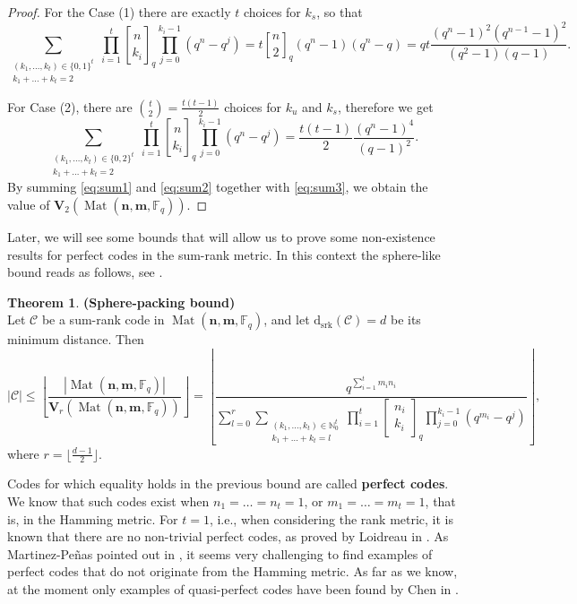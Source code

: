 \documentclass[11pt]{amsart}
\newcommand{\qqbin}[2]{\begin{bmatrix}
		{#1} \\ {#2 }
\end{bmatrix}_q}
\newcommand{\dsrk}{\mathrm{d}_{\mathrm{srk}}}
\DeclareMathOperator{\Mat}{Mat}
\theoremstyle{definition}
\newtheorem{theorem}{Theorem}[section]
\newcommand{\F}{{\mathbb F}}
\newcommand{\bfn}{\mathbf {n}}
\newcommand{\bfm}{\mathbf {m}}
\newcommand{\spacmn}{\Mat(\bfn,\bfm,\F_q)}
\newcommand{\qbinom}[2]{\genfrac{[}{]}{0pt}{}{#1}{#2}_q}
\begin{document}
\begin{proof}
For the Case (1) there are exactly $t$ choices for $k_s$, so that 
\begin{equation}\label{eq:sum1}
\sum_{\substack{(k_1,\ldots,k_t) \in \{0,1\}^t \\ k_1+\ldots +k_t=2}}\prod_{i=1}^{t}\qbinom{n}{k_i}\prod_{j=0}^{k_i-1}(q^n-q^j)=t\qbinom{n}{2}(q^n-1)(q^n-q)=qt\frac{(q^n-1)^2(q^{n-1}-1)^2}{(q^2-1)(q-1)}.
\end{equation}

For Case (2), there are $\binom{t}{2}=\frac{t(t-1)}{2}$ choices for $k_u$ and $k_s$, therefore we get 
\begin{equation}\label{eq:sum2}
\sum_{\substack{(k_1,\ldots,k_t) \in \{0,2\}^t \\ k_1+\ldots +k_t=2}}\prod_{i=1}^{t}\qbinom{n}{k_i}\prod_{j=0}^{k_i-1}(q^n-q^j)=\frac{t(t-1)}{2}\frac{(q^n-1)^4}{(q-1)^2}.
\end{equation}
By summing \eqref{eq:sum1} and \eqref{eq:sum2} together with \eqref{eq:sum3}, we obtain the value of $\mathbf{V}_2(\spacmn)$.
\end{proof}



Later, we will see some bounds that will allow us to prove some non-existence results for perfect codes in the sum-rank metric.
In this context the sphere-like bound reads as follows, see \cite[Theorem III.6]{byrne2021fundamental}.

\begin{theorem} \label{H} \textbf{(Sphere-packing bound)} \\
Let $\mathcal{C}$ be a sum-rank code in $\spacmn$, and let $\dsrk(\mathcal{C}) = d$ be its minimum distance. Then
\[
|\mathcal{C}| \leq \left\lfloor \frac{|\spacmn|}{\mathbf{V}_r(\spacmn)} \right\rfloor
= \left\lfloor \frac{q^{\sum_{i=1}^{t} m_i n_i}}{
\sum_{l=0}^{r} \sum_{\substack{(k_1,\ldots,k_t) \in \mathbb{N}_0^t \\ k_1 + \ldots + k_t = l}} 
\prod_{i=1}^{t} \qqbin{n_i}{k_i} \prod_{j=0}^{k_i - 1}(q^{m_i} - q^j)
} \right\rfloor,
\]
where $ r = \lfloor \frac{d - 1}{2} \rfloor $.
\end{theorem}

Codes for which equality holds in the previous bound are called \textbf{perfect codes}.
We know that such codes exist when $n_1 = \ldots = n_t = 1$, or $m_1 = \ldots = m_t = 1$, that is, in the Hamming metric. For $t = 1$, i.e., when considering the rank metric, it is known that there are no non-trivial perfect codes, as proved by Loidreau in \cite{loidreau2006properties}. As Martinez-Pe\~{n}as
 pointed out in \cite{martinezpenas2021hamming}, it seems very challenging to find examples of perfect codes that do not originate from the Hamming metric.
As far as we know, at the moment only examples of quasi-perfect codes have been found by Chen in \cite{chen2024quasi}.
\end{document}
